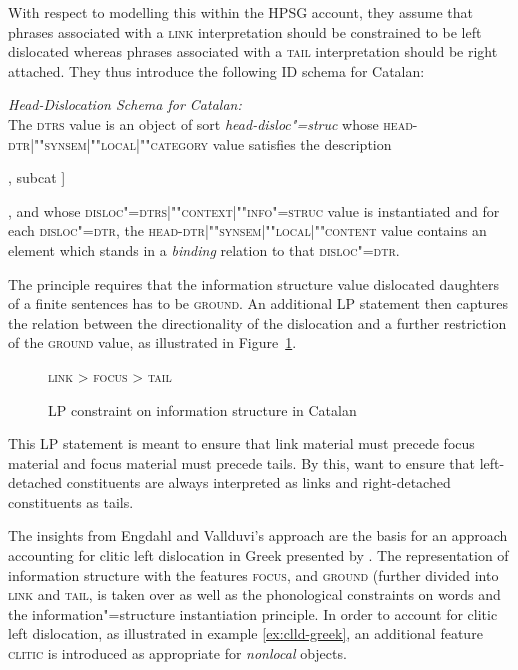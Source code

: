 \documentclass[output=paper]{langsci/langscibook}
\begin{document}
With respect to modelling this within the HPSG account, they assume
that phrases associated with a \textsc{link} interpretation should be
constrained to be left dislocated whereas phrases associated with a
\textsc{tail} interpretation should be right attached.
They thus introduce the following ID schema for Catalan:
\begin{sloppy}
\begin{exe}
\ex  \textit{Head-Dislocation Schema for Catalan:}\\
  The \textsc{dtrs} value is an object of sort
  \textit{head-disloc"=struc} whose
  \textsc{head-dtr|""syn\-sem|""local|""category} value satisfies the
  description\\
  \begin{avm} [head \type{verb}[vform \type{finite}], subcat \elst]
  \end{avm}, and whose
  \textsc{disloc"=dtrs|""context|""info"=struc} value is instantiated and
  for each \textsc{disloc"=dtr}, the
  \textsc{head-dtr|""synsem|""local|""content} value contains an element
  which stands in a \textit{binding} relation to that
  \textsc{disloc"=dtr}.
\end{exe}
\end{sloppy}

The principle requires that the information structure value
dislocated daughters of a finite sentences has to be
\textsc{ground}. An additional LP statement then captures the relation
between the directionality of the dislocation and a further
restriction of the \textsc{ground} value, as illustrated in
Figure~\ref{fig:lp-catalan}.
\begin{figure}[htp]
  \centering
  \textsc{link} > \textsc{focus} > \textsc{tail}
  \caption{LP constraint on information structure in Catalan}
  \label{fig:lp-catalan}
\end{figure}
This LP statement is meant to ensure that link material must precede
focus material and focus material must precede tails. By this,
\cite{EV96a} want to ensure that left-detached constituents are always
interpreted as links and right-detached constituents as tails.

The insights from Engdahl and Vallduvi's approach are the basis for an
approach accounting for clitic left dislocation in Greek presented by
\cite{AK2002a}. The representation of information structure with the
features \textsc{focus}, and \textsc{ground} (further divided into
\textsc{link} and \textsc{tail}, is taken over as well as the
phonological constraints on words and the information"=structure
instantiation principle. In order to account for clitic left
dislocation, as illustrated in example \ref{ex:clld-greek}, an
additional feature \textsc{clitic} is introduced as appropriate for
\textit{nonlocal} objects.
\end{document}
